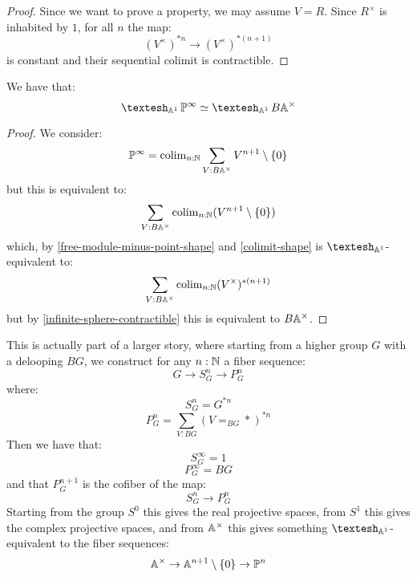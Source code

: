 \begin{proof}
Since we want to prove a property, we may assume $V=R$. Since $R^\times$ is inhabited by $1$, for all $n$ the map:
\[(V^\times)^{*n} \to (V^\times)^{*(n+1)}\]
is constant and their sequential colimit is contractible.
\end{proof}

\begin{proposition}\label{shape-projective-infinity}
We have that:
\[\shape_{\A^1} \bP^\infty \simeq \shape_{\A^1} B\A^\times\]
\end{proposition}

\begin{proof}
We consider:
\[\mathbb{P}^\infty = \mathrm{colim}_{n:\mathbb{N}} \sum_{V:B\mathbb{A}^\times} V^{n+1}\setminus\{0\}\]
but this is equivalent to:
\[ \sum_{V:B\mathbb{A}^\times}\mathrm{colim}_{n:\mathbb{N}} (V^{n+1}\setminus\{0\}) \]
which, by \cref{free-module-minus-point-shape} and \cref{colimit-shape} is $\shape_{\A^1}$-equivalent to:
\[ \sum_{V:B\mathbb{A}^\times}\mathrm{colim}_{n:\mathbb{N}} (V^\times)^{*(n+1)}\]
but by \cref{infinite-sphere-contractible} this is equivalent to $B\mathbb{A}^\times$.
\end{proof}

\begin{remark}
This is actually part of a larger story, where starting from a higher group $G$ with a delooping $BG$, we construct for any $n:\mathbb{N}$ a fiber sequence:
\[G \to S_G^n \to P_G^n\]
where:
\[S_G^n = G^{*n}\]
\[P_G^n = \sum_{V:BG} (V=_{BG}*)^{*n}\]
Then we have that:
\[S_G^\infty = 1\]
\[P_G^\infty = BG\]
and that $P_G^{n+1}$ is the cofiber of the map:
\[S_G^n \to P_G^n\]
Starting from the group $S^0$ this gives the real projective spaces, from $S^1$ this gives the complex projective spaces, and from $\mathbb{A}^\times$ this gives something $\shape_{\A^1}$-equivalent to the fiber sequences:
\[\mathbb{A}^\times \to \mathbb{A}^{n+1} \setminus \{0\} \to \mathbb{P}^n\]
\end{remark}